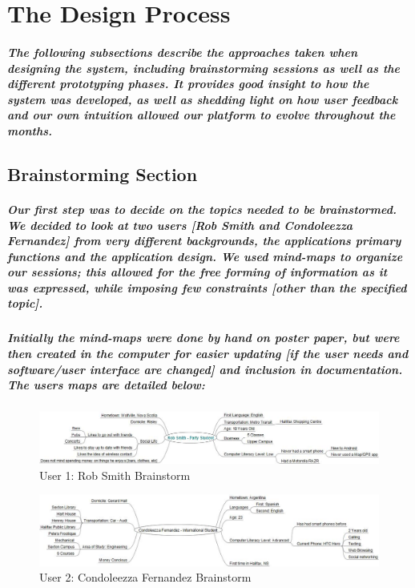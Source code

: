 \documentclass{report}
\begin{document}
\chapter{The Design Process}
    \paragraph{The following subsections describe the approaches taken when
    designing the system, including brainstorming sessions as well as the different
    prototyping phases. It provides good insight to how the system was developed, as
    well as shedding light on how user feedback and our own intuition allowed our
    platform to evolve throughout the months.}
\section{Brainstorming Section}
    \paragraph{Our first step was to decide on the topics needed to be brainstormed.
    We decided to look at two users [Rob Smith and Condoleezza Fernandez] from very
    different backgrounds, the applications primary functions and the application
    design. We used mind-maps to organize our sessions; this allowed for the free
    forming of information as it was expressed, while imposing few constraints
    [other than the specified topic].}
    \paragraph{Initially the mind-maps were done by hand on poster paper, but were
    then created in the computer for easier updating [if the user needs and
    software/user interface are changed] and inclusion in documentation. The users
    maps are detailed below:}
    \begin{figure}
        \centering
            \includegraphics[width=\textwidth]{img/figure411.jpg}
        \caption{User 1: Rob Smith Brainstorm}
    \end{figure}
    \begin{figure}
        \centering
            \includegraphics[width=\textwidth]{img/figure412.jpg}
        \caption{User 2: Condoleezza Fernandez Brainstorm}
    \end{figure}
\end{document}
